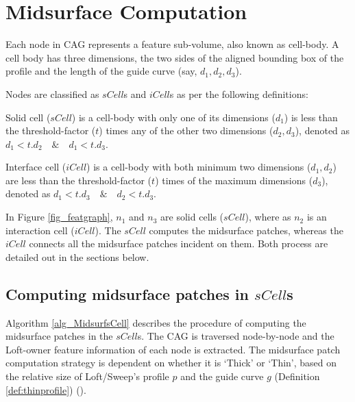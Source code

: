 \section{Midsurface Computation}
\label{sec:midsurface}

Each node in CAG represents a feature sub-volume, also known as cell-body. A cell body has three dimensions, the two sides of the aligned bounding box of the profile and the length of the guide curve (say, $d_1,d_2,d_3$).
%

Nodes are classified as $sCell$s and $iCell$s as per the following definitions:
\begin{mydef}
\label{def:scell}
Solid cell ($sCell$) is a cell-body with only one of its dimensions ($d_1$) is less than the threshold-factor ($t$) times any of the other two dimensions ($d_2, d_3$), denoted as  $d_1 < t.d_2 \quad \&  \quad d_1 < t.d_3$. %
\end{mydef}
\begin{mydef}
\label{def:icell}
Interface cell ($iCell$) is a cell-body with  both minimum two dimensions ($d_1,d_2$)  are less than the threshold-factor ($t$) times of the maximum dimensions ($d_3$), denoted as  $d_1 < t.d_3 \quad \&  \quad d_2 < t.d_3$. %
\end{mydef}

In Figure \ref{fig_featgraph},  $n_1$ and $n_3$ are solid cells ($sCell$), where as $n_2$ is an interaction cell ($iCell$).  The $sCell$ computes the midsurface patches, whereas the  $iCell$ connects all the midsurface patches incident on them. Both process are detailed out in the sections below.
			


\subsection{Computing midsurface patches in $sCell$s}
\label{sec:scell}
 Algorithm \ref{alg_MidsurfsCell} describes the procedure of computing the midsurface patches in the $sCell$s. The CAG is traversed node-by-node and the Loft-owner feature information of each node is extracted. The midsurface patch computation strategy is dependent on whether it is `Thick' or `Thin', based on the relative size of Loft/Sweep's profile $p$ and the guide curve $g$  (Definition \ref{def:thinprofile}) (\cite{YogeshIITG2014}). %

